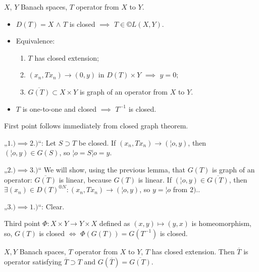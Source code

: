 \documentclass[12pt]{article}					%
\begin{document}
\begin{tvrzeni}
	$X$, $Y$ Banach spaces, $T$ operator from $X$ to $Y$.

	\begin{itemize}
		\item $D(T) = X$ $\land$ $T$ is closed $\implies$ $T \in ©L(X, Y)$.
		\item Equivalence:
			\begin{enumerate}
				\item $T$ has closed extension;
				\item $(x_n, T x_n) \rightarrow (0, y)$ in $D(T) \times Y$ $\implies$ $y = 0$;
				\item $\overline{G(T)} \subset X \times Y$ is graph of an operator from $X$ to $Y$.
			\end{enumerate}
		\item $T$ is one-to-one and closed $\implies$ $T^{-1}$ is closed.
	\end{itemize}

	\begin{dukazin}
		First point follows immediately from closed graph theorem.

		„$1.) \implies 2.)$“: Let $S \supset T$ be closed. If $(x_n, T x_n) \rightarrow (¦o, y)$, then $(¦o, y) \in G(S)$, so $¦o = S ¦o = y$.

		„$2.) \implies 3.)$“ We will show, using the previous lemma, that $G(T)$ is graph of an operator: $\overline{G(T)}$ is linear, because $G(T)$ is linear. If $(¦o, y) \in \overline{G(T)}$, then $\exists (x_n) \in D(T)^{®N}: (x_n, T x_n) \rightarrow (¦o, y)$, so $y = ¦o$ from $2).$.

		„$3.) \implies 1.)$“: Clear.

		Third point $Φ: X \times Y \rightarrow Y \times X$ defined as $(x, y) \mapsto (y, x)$ is homeomorphism, so, $G(T)$ is closed $\Leftrightarrow$ $Φ(G(T)) = G(T^{-1})$ is closed.
	\end{dukazin}
\end{tvrzeni}

\begin{definice}
	$X, Y$ Banach spaces, $T$ operator from $X$ to $Y$, $T$ has closed extension. Then $\overline{T}$ is operator satisfying $\overline{T} \supset T$ and $G(\overline{T}) = \overline{G(T)}$.
\end{definice}
\end{document}
